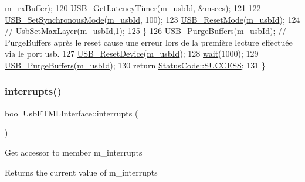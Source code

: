 \begin{DoxyCode}
      \hyperlink{classUsbFTMLInterface_a8f0f8bb2a4fe14ca4890695f41fbcbf8}{m\_rxBuffer});
120     \hyperlink{LALUsbML_8h_a90c0ec96b211bb1b45c4b26afe6f6ced}{USB\_GetLatencyTimer}(\hyperlink{classUsbFTMLInterface_aab6754587c303660d5c498ce34a2b4c8}{m\_usbId}, &msecs);
121 
122     \hyperlink{LALUsbML_8h_a33d11c5713bc41165b004b1ed3a1b408}{USB\_SetSynchronousMode}(\hyperlink{classUsbFTMLInterface_aab6754587c303660d5c498ce34a2b4c8}{m\_usbId}, 100);
123     \hyperlink{LALUsbML_8h_a784f57af1433a5334f4a7d23ee4caad9}{USB\_ResetMode}(\hyperlink{classUsbFTMLInterface_aab6754587c303660d5c498ce34a2b4c8}{m\_usbId});
124     \textcolor{comment}{//   UsbSetMaxLayer(m\_usbId,1);}
125   \}
126   \hyperlink{LALUsbML_8h_ab28cf26b80d470d84681e4da8a38afd7}{USB\_PurgeBuffers}(\hyperlink{classUsbFTMLInterface_aab6754587c303660d5c498ce34a2b4c8}{m\_usbId}); \textcolor{comment}{// PurgeBuffers après le reset cause une erreur lors de
       la première lecture effectuée via le port usb.}
127   \hyperlink{LALUsbML_8h_a77b48cfbf9075545430b778cd4ad777f}{USB\_ResetDevice}(\hyperlink{classUsbFTMLInterface_aab6754587c303660d5c498ce34a2b4c8}{m\_usbId});
128   \hyperlink{Tools_8h_a74d6a3fc8194eaac3e1f888db0542be9}{wait}(1000);
129   \hyperlink{LALUsbML_8h_ab28cf26b80d470d84681e4da8a38afd7}{USB\_PurgeBuffers}(\hyperlink{classUsbFTMLInterface_aab6754587c303660d5c498ce34a2b4c8}{m\_usbId}); 
130   \textcolor{keywordflow}{return} \hyperlink{classStatusCode_a6f565cbeadc76d14c72f047e5e85eb4badd0da38d3ba0d922efd1f4619bc37ad8}{StatusCode::SUCCESS};
131 \}
\end{DoxyCode}
\mbox{\label{classUsbFTMLInterface_afab1c2175bd2bca261ffa2b8ee67df2d}} 
\subsubsection{\texorpdfstring{interrupts()}{interrupts()}}
{\footnotesize\ttfamily bool Usb\+F\+T\+M\+L\+Interface\+::interrupts (\begin{DoxyParamCaption}{ }\end{DoxyParamCaption})\hspace{0.3cm}{\ttfamily [inline]}}

Get accessor to member m\+\_\+interrupts \begin{DoxyReturn}{Returns}
the current value of m\+\_\+interrupts 
\end{DoxyReturn}


